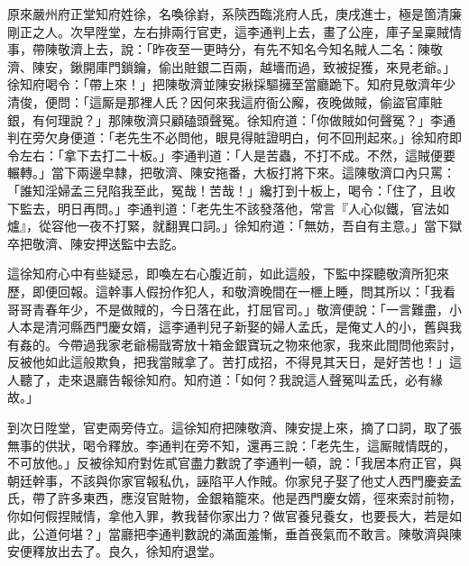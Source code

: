 原來嚴州府正堂知府姓徐，名喚徐崶，系陝西臨洮府人氏，庚戌進士，極是箇清廉剛正之人。次早陞堂，左右排兩行官吏，這李通判上去，畫了公座，庫子呈稟賊情事，帶陳敬濟上去，說：「昨夜至一更時分，有先不知名今知名賊人二名：陳敬濟、陳安，鍬開庫門鎖鑰，偷出賍銀二百兩，越墻而過，致被捉獲，來見老爺。」徐知府喝令：「帶上來！」把陳敬濟並陳安揪採驅擁至當廳跪下。知府見敬濟年少清俊，{}便問：「這厮是那裡人氏？因何來我這府衙公廨，夜晚做賊，偷盜官庫賍銀，有何理說？」那陳敬濟只顧磕頭聲冤。徐知府道：「你做賊如何聲冤？」李通判在旁欠身便道：「老先生不必問他，眼見得賍證明白，何不回刑起來。」徐知府即令左右：「拿下去打二十板。」李通判道：「人是苦蟲，不打不成。不然，這賊便要輾轉。」當下兩邊皁隸，把敬濟、陳安拖番，大板打將下來。這陳敬濟口內只罵：「誰知淫婦孟三兒陷我至此，冤哉！苦哉！」{}{}纔打到十板上，喝令：「住了，且收下監去，明日再問。」李通判道：「老先生不該發落他，常言『人心似鐵，官法如爐』，從容他一夜不打緊，就翻異口詞。」徐知府道：「無妨，吾自有主意。」當下獄卒把敬濟、陳安押送監中去訖。

這徐知府心中有些疑忌，即喚左右心腹近前，如此這般，下監中探聽敬濟所犯來歷，{}即便回報。這幹事人假扮作犯人，和敬濟晚間在一㭱上睡，問其所以：「我看哥哥青春年少，不是做賊的，今日落在此，打屈官司。」敬濟便說：「一言難盡，小人本是清河縣西門慶女婿，這李通判兒子新娶的婦人孟氏，是俺丈人的小，舊與我有姦的。今帶過我家老爺楊戩寄放十箱金銀寶玩之物來他家，我來此間問他索討，反被他如此這般欺負，把我當賊拿了。苦打成招，不得見其天日，是好苦也！」這人聽了，走來退廳告報徐知府。知府道：「如何？我說這人聲冤叫孟氏，必有緣故。」{}

到次日陞堂，官吏兩旁侍立。這徐知府把陳敬濟、陳安提上來，摘了口詞，取了張無事的供狀，喝令釋放。李通判在旁不知，還再三說：「老先生，這厮賊情既的，不可放他。」反被徐知府對佐貳官盡力數說了李通判一頓，說：「我居本府正官，與朝廷幹事，不該與你家官報私仇，誣陷平人作賊。你家兒子娶了他丈人西門慶妾孟氏，帶了許多東西，應沒官賍物，金銀箱籠來。他是西門慶女婿，徑來索討前物，你如何假捏賊情，拿他入罪，教我替你家出力？做官養兒養女，也要長大，若是如此，公道何堪？」{}當廳把李通判數說的滿面羞慚，垂首䘮氣而不敢言。陳敬濟與陳安便釋放出去了。良久，徐知府退堂。

